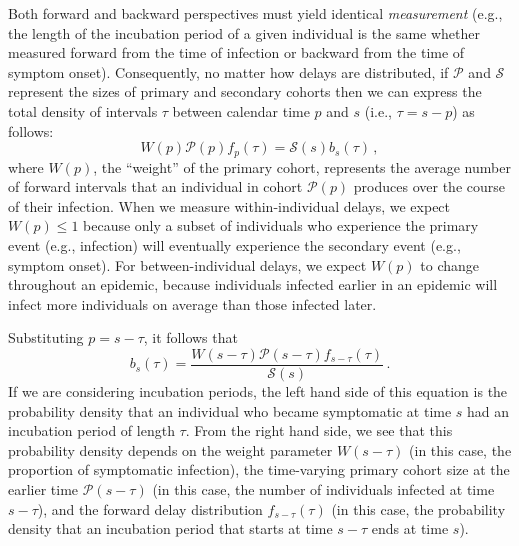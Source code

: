 \documentclass[12pt]{article}
\newcommand{\psymp}{\ensuremath{p}} %
\newcommand{\ssymp}{\ensuremath{s}} %
\newcommand{\psize}{{\mathcal P}} %
\newcommand{\ssize}{{\mathcal S}} %
\begin{document}
Both forward and backward perspectives
must yield identical \emph{measurement} (e.g., the length of the incubation
period of a given individual is the same whether measured forward from
the time of infection or backward from the time of symptom onset).
Consequently, no matter how delays are distributed, if
$\mathcal P$ and $\mathcal S$ represent the sizes of primary and
secondary cohorts then we can express the total density of intervals $\tau$ between calendar time $\psymp$ and $\ssymp$ (i.e., $\tau=\ssymp-\psymp$) as follows:
\begin{equation}
W(\psymp) \psize(\psymp) f_\psymp(\tau) = \ssize(\ssymp) b_\ssymp(\tau) \,,
\label{eq:match}
\end{equation}
where $W(\psymp)$, the ``weight'' of the primary cohort, represents the average number of forward intervals that an individual in cohort $\psize(\psymp)$ produces over the course of their infection.
When we measure within-individual delays, we expect $W(\psymp) \leq 1$ because only a subset of individuals who experience the primary event (e.g., infection) will eventually experience the secondary event (e.g., symptom onset).
For between-individual delays, we expect $W(\psymp)$ to change throughout an epidemic, because individuals infected earlier in an epidemic will infect more individuals on average than those infected later.

Substituting $\psymp=\ssymp-\tau$, it follows that
\begin{equation}
b_\ssymp(\tau)= \frac{W(\ssymp-\tau) \psize(\ssymp-\tau) f_{\ssymp-\tau} (\tau)}{\ssize(\ssymp)}\,.
\label{eq:backward}
\end{equation}
If we are considering incubation periods, the left hand side of
this equation is the probability density that an individual
who became symptomatic at time $\ssymp$ had an incubation period of
length $\tau$.
From the right hand side, we see that this probability density depends on the weight parameter $W(\ssymp-\tau)$ (in this case, the proportion of symptomatic infection),
the time-varying primary cohort size at the earlier time $\psize(\ssymp-\tau)$ (in this case, the number of individuals infected at time $\ssymp-\tau$),
and the forward delay distribution $f_{\ssymp-\tau}(\tau)$ (in this case, the probability density that an incubation period that starts at time $\ssymp-\tau$ ends at time $\ssymp$).
\end{document}
